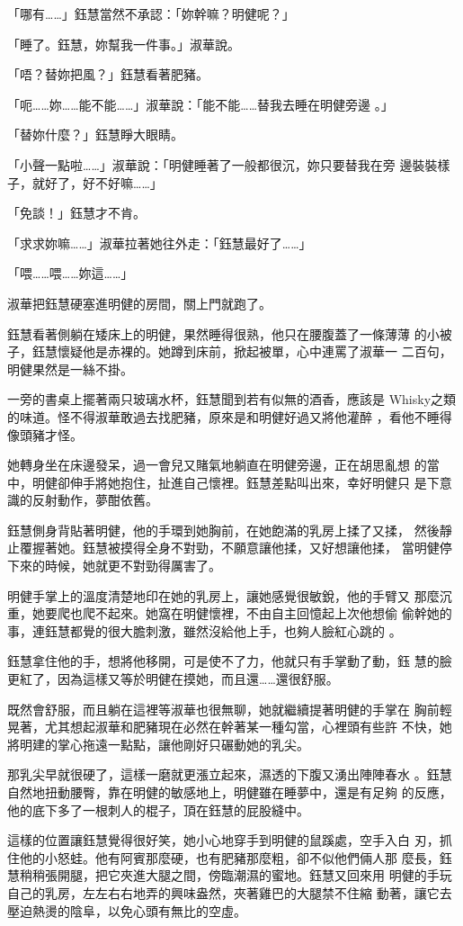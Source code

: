 「哪有……」鈺慧當然不承認：「妳幹嘛？明健呢？」

「睡了。鈺慧，妳幫我一件事。」淑華說。

「唔？替妳把風？」鈺慧看著肥豬。

「呃……妳……能不能……」淑華說：「能不能……替我去睡在明健旁邊
。」

「替妳什麼？」鈺慧睜大眼睛。

「小聲一點啦……」淑華說：「明健睡著了一般都很沉，妳只要替我在旁
邊裝裝樣子，就好了，好不好嘛……」

「免談！」鈺慧才不肯。

「求求妳嘛……」淑華拉著她往外走：「鈺慧最好了……」

「喂……喂……妳這……」

淑華把鈺慧硬塞進明健的房間，關上門就跑了。

鈺慧看著側躺在矮床上的明健，果然睡得很熟，他只在腰腹蓋了一條薄薄
的小被子，鈺慧懷疑他是赤裸的。她蹲到床前，掀起被單，心中連罵了淑華一
二百句，明健果然是一絲不掛。

一旁的書桌上擺著兩只玻璃水杯，鈺慧聞到若有似無的酒香，應該是
Whisky之類的味道。怪不得淑華敢過去找肥豬，原來是和明健好過又將他灌醉
，看他不睡得像頭豬才怪。

她轉身坐在床邊發呆，過一會兒又賭氣地躺直在明健旁邊，正在胡思亂想
的當中，明健卻伸手將她抱住，扯進自己懷裡。鈺慧差點叫出來，幸好明健只
是下意識的反射動作，夢酣依舊。

鈺慧側身背貼著明健，他的手環到她胸前，在她飽滿的乳房上揉了又揉，
然後靜止覆握著她。鈺慧被摸得全身不對勁，不願意讓他揉，又好想讓他揉，
當明健停下來的時候，她就更不對勁得厲害了。

明健手掌上的溫度清楚地印在她的乳房上，讓她感覺很敏銳，他的手臂又
那麼沉重，她要爬也爬不起來。她窩在明健懷裡，不由自主回憶起上次他想偷
偷幹她的事，連鈺慧都覺的很大膽刺激，雖然沒給他上手，也夠人臉紅心跳的
。

鈺慧拿住他的手，想將他移開，可是使不了力，他就只有手掌動了動，鈺
慧的臉更紅了，因為這樣又等於明健在摸她，而且還……還很舒服。

既然會舒服，而且躺在這裡等淑華也很無聊，她就繼續提著明健的手掌在
胸前輕晃著，尤其想起淑華和肥豬現在必然在幹著某一種勾當，心裡頭有些許
不快，她將明建的掌心拖遠一點點，讓他剛好只碾動她的乳尖。

那乳尖早就很硬了，這樣一磨就更漲立起來，濕透的下腹又湧出陣陣春水
。鈺慧自然地扭動腰臀，靠在明健的敏感地上，明健雖在睡夢中，還是有足夠
的反應，他的底下多了一根刺人的棍子，頂在鈺慧的屁股縫中。

這樣的位置讓鈺慧覺得很好笑，她小心地穿手到明健的鼠蹊處，空手入白
刃，抓住他的小怒蛙。他有阿賓那麼硬，也有肥豬那麼粗，卻不似他們倆人那
麼長，鈺慧稍稍張開腿，把它夾進大腿之間，傍臨潮濕的蜜地。鈺慧又回來用
明健的手玩自己的乳房，左左右右地弄的興味盎然，夾著雞巴的大腿禁不住縮
動著，讓它去壓迫熱燙的陰阜，以免心頭有無比的空虛。

